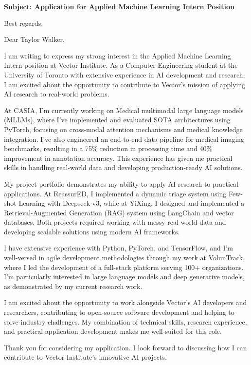 \documentclass[11pt,a4paper,roman]{moderncv}
\begin{document}
\date{\today}
\opening{\textbf{Subject: Application for Applied Machine Learning Intern Position}}
\closing{Best regards,}

\makelettertitle

Dear Taylor Walker,

I am writing to express my strong interest in the Applied Machine Learning Intern position at Vector Institute. As a Computer Engineering student at the University of Toronto with extensive experience in AI development and research, I am excited about the opportunity to contribute to Vector's mission of applying AI research to real-world problems.

At CASIA, I'm currently working on Medical multimodal large language models (MLLMs), where I've implemented and evaluated SOTA architectures using PyTorch, focusing on cross-modal attention mechanisms and medical knowledge integration. I've also engineered an end-to-end data pipeline for medical imaging benchmarks, resulting in a 75\% reduction in processing time and 40\% improvement in annotation accuracy. This experience has given me practical skills in handling real-world data and developing production-ready AI solutions.

My project portfolio demonstrates my ability to apply AI research to practical applications. At ReassurED, I implemented a dynamic triage system using Few-shot Learning with Deepseek-v3, while at YiXing, I designed and implemented a Retrieval-Augmented Generation (RAG) system using LangChain and vector databases. Both projects required working with messy real-world data and developing scalable solutions using modern AI frameworks.

I have extensive experience with Python, PyTorch, and TensorFlow, and I'm well-versed in agile development methodologies through my work at VolunTrack, where I led the development of a full-stack platform serving 100+ organizations. I'm particularly interested in large language models and deep generative models, as demonstrated by my current research work.

I am excited about the opportunity to work alongside Vector's AI developers and researchers, contributing to open-source software development and helping to solve industry challenges. My combination of technical skills, research experience, and practical application development makes me well-suited for this role.

Thank you for considering my application. I look forward to discussing how I can contribute to Vector Institute's innovative AI projects.

\makeletterclosing
\end{document}
